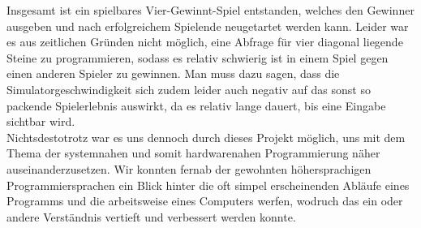 Insgesamt ist ein spielbares Vier-Gewinnt-Spiel entstanden, welches den Gewinner ausgeben und nach erfolgreichem Spielende neugetartet werden kann.
Leider war es aus zeitlichen Gründen nicht möglich, eine Abfrage für vier diagonal liegende Steine zu programmieren, sodass es relativ schwierig ist in einem Spiel gegen einen anderen Spieler zu gewinnen.
Man muss dazu sagen, dass die Simulatorgeschwindigkeit sich zudem leider auch negativ auf das sonst so packende Spielerlebnis auswirkt, da es relativ lange dauert, bis eine Eingabe sichtbar wird.\\
Nichtsdestotrotz war es uns dennoch durch dieses Projekt möglich, uns mit dem Thema der systemnahen und somit hardwarenahen Programmierung näher auseinanderzusetzen. Wir konnten fernab der gewohnten höhersprachigen Programmiersprachen ein Blick hinter die oft simpel erscheinenden Abläufe eines Programms und die arbeitsweise eines Computers werfen, wodruch das ein oder andere Verständnis vertieft und verbessert werden konnte.


